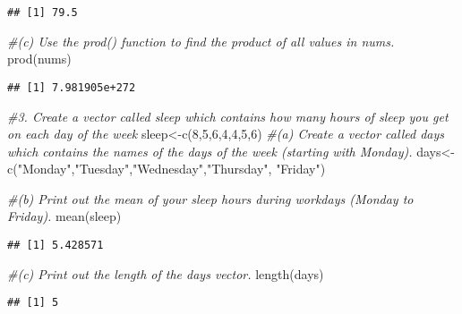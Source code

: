 \documentclass[
]{article}
\newenvironment{Shaded}{\begin{snugshade}}{\end{snugshade}}
\newcommand{\CommentTok}[1]{\textcolor[rgb]{0.56,0.35,0.01}{\textit{#1}}}
\newcommand{\DecValTok}[1]{\textcolor[rgb]{0.00,0.00,0.81}{#1}}
\newcommand{\FunctionTok}[1]{\textcolor[rgb]{0.00,0.00,0.00}{#1}}
\newcommand{\NormalTok}[1]{#1}
\newcommand{\OtherTok}[1]{\textcolor[rgb]{0.56,0.35,0.01}{#1}}
\newcommand{\StringTok}[1]{\textcolor[rgb]{0.31,0.60,0.02}{#1}}
\begin{document}
\begin{verbatim}
## [1] 79.5
\end{verbatim}

\begin{Shaded}
\begin{Highlighting}[]
\CommentTok{\#(c) Use the prod() function to find the product of all values in nums.}
\FunctionTok{prod}\NormalTok{(nums)}
\end{Highlighting}
\end{Shaded}

\begin{verbatim}
## [1] 7.981905e+272
\end{verbatim}

\begin{Shaded}
\begin{Highlighting}[]
\CommentTok{\#3. Create a vector called sleep which contains how many hours of sleep you get on each day of the week }
\NormalTok{sleep}\OtherTok{\textless{}{-}}\FunctionTok{c}\NormalTok{(}\DecValTok{8}\NormalTok{,}\DecValTok{5}\NormalTok{,}\DecValTok{6}\NormalTok{,}\DecValTok{4}\NormalTok{,}\DecValTok{4}\NormalTok{,}\DecValTok{5}\NormalTok{,}\DecValTok{6}\NormalTok{)}
\CommentTok{\#(a) Create a vector called days which contains the names of the days of the week (starting with Monday).}
\NormalTok{days}\OtherTok{\textless{}{-}}\FunctionTok{c}\NormalTok{(}\StringTok{"Monday"}\NormalTok{,}\StringTok{"Tuesday"}\NormalTok{,}\StringTok{"Wednesday"}\NormalTok{,}\StringTok{"Thursday"}\NormalTok{, }\StringTok{"Friday"}\NormalTok{)}

\CommentTok{\#(b) Print out the mean of your sleep hours during workdays (Monday to Friday).}
\FunctionTok{mean}\NormalTok{(sleep)}
\end{Highlighting}
\end{Shaded}

\begin{verbatim}
## [1] 5.428571
\end{verbatim}

\begin{Shaded}
\begin{Highlighting}[]
\CommentTok{\#(c) Print out the length of the days vector.}
\FunctionTok{length}\NormalTok{(days)}
\end{Highlighting}
\end{Shaded}

\begin{verbatim}
## [1] 5
\end{verbatim}
\end{document}
